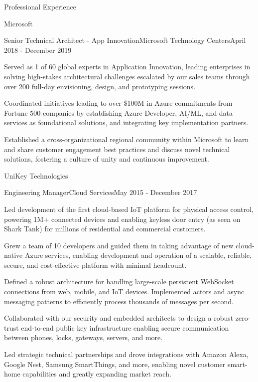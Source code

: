 \documentclass{resume} %
\begin{document}
\begin{rSection}{Professional Experience}
\begin{rCompany}{Microsoft}{}{}
    \begin{rRole}{Senior Technical Architect - App Innovation}{Microsoft Technology Centers}{April 2018 - December 2019}
        \item Served as 1 of 60 global experts in Application Innovation, leading enterprises in solving high-stakes architectural challenges escalated by our sales teams through over 200 full-day envisioning, design, and prototyping sessions. 
        \item Coordinated initiatives leading to over \$100M in Azure commitments from Fortune 500 companies by establishing Azure Developer, AI/ML, and data services as foundational solutions, and integrating key implementation partners.
        \item Established a cross-organizational regional community within Microsoft to learn and share customer engagement best practices and discuss novel technical solutions, fostering a culture of unity and continuous improvement.
    \end{rRole}
  \end{rCompany}

  \begin{rCompany}{UniKey Technologies}{}{}
    \begin{rRole}{Engineering Manager}{Cloud Services}{May 2015 - December 2017}
      \item Led development of the first cloud-based IoT platform for physical access control, powering 1M+ connected devices and enabling keyless door entry (as seen on Shark Tank) for millions of residential and commercial customers.
      \item Grew a team of 10 developers and guided them in taking advantage of new cloud-native Azure services, enabling development and operation of a scalable, reliable, secure, and cost-effective platform with minimal headcount.
      \item Defined a robust architecture for handling large-scale persistent WebSocket connections from web, mobile, and IoT devices. Implemented actors and async messaging patterns to efficiently process thousands of messages per second.
      \item Collaborated with our security and embedded architects to design a robust zero-trust end-to-end public key infrastructure enabling secure communication between phones, locks, gateways, servers, and more.
      \item Led strategic technical partnerships and drove integrations with Amazon Alexa, Google Nest, Samsung SmartThings, and more, enabling novel customer smart-home capabilities and greatly expanding market reach.
    \end{rRole}
  \end{rCompany}


\end{rSection}
\end{document}
